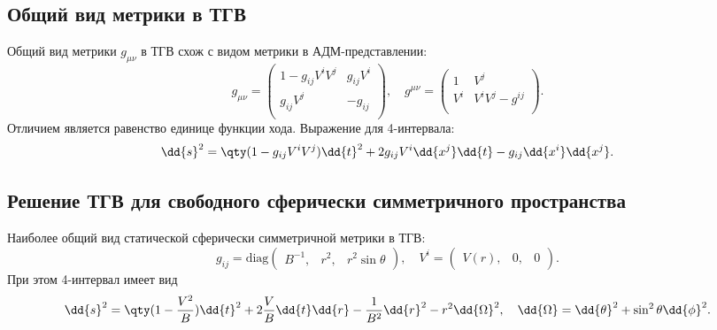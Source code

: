 \documentclass[\docroot/reports/draft/report.tex]{subfiles}
\begin{document}
\onlyinsubfile{\tableofcontents}

\subsection{Общий вид метрики в ТГВ}

    Общий вид метрики $g_{\mu\nu}$ в ТГВ схож с видом метрики в АДМ-представлении:
    \begin{equation*}
        g_{\mu\nu} = \begin{pmatrix}
            1 - g_{ij} V^i V^j   &   g_{ij} V^i \\
            g_{ij} V^j           &   - g_{ij}   \\
        \end{pmatrix} , \quad
        g^{\mu\nu} = \begin{pmatrix}
            1   & V^j                \\
            V^i & V^i V^j - g^{ij}   \\
        \end{pmatrix} .
    \end{equation*}
    Отличием является равенство единице функции хода. Выражение для 4-интервала:
    \begin{equation*}
        \dd{s}^2 = \qty(1 - g_{ij} V^i V^j) \dd{t}^2 + 2 g_{ij} V^i \dd{x^j} \dd{t} - g_{ij} \dd{x^i}\dd{x^j} .
    \end{equation*}

\subsection{Решение ТГВ для свободного сферически симметричного пространства}

    Наиболее общий вид статической сферически симметричной метрики в ТГВ:
    \begin{equation*}
        g_{ij} = \text{diag} \begin{pmatrix}B^{-1}, & r^2, & r^2 \sin\theta\end{pmatrix} , \quad
        V^i = \begin{pmatrix}V(r), & 0, & 0\end{pmatrix} .
    \end{equation*}
    При этом 4-интервал имеет вид
    \begin{equation*}
        \dd{s}^2 = \qty(1 - \frac{V^2}{B}) \dd{t}^2 + 2 \frac{V}{B} \dd{t} \dd{r} - \frac{1}{B^2} \dd{r}^2 - r^2 \dd{\Omega}^2 , \quad \dd{\Omega} = \dd{\theta}^2 + \sin^2{\theta} \dd{\phi}^2 .
    \end{equation*}
\end{document}
